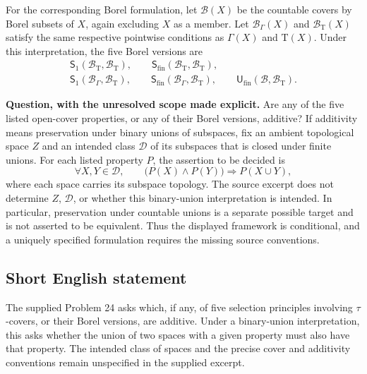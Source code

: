 \documentclass[11pt]{article}
\begin{document}
For the corresponding Borel formulation, let \(\mathcal B(X)\) be the countable covers by Borel subsets of \(X\), again excluding \(X\) as a member. Let \(\mathcal B_\Gamma(X)\) and \(\mathcal B_{\mathrm T}(X)\) satisfy the same respective pointwise conditions as \(\Gamma(X)\) and \(\mathrm T(X)\). Under this interpretation, the five Borel versions are
\[
\begin{gathered}
\mathsf S_1(\mathcal B_{\mathrm T},\mathcal B_{\mathrm T}),\qquad
\mathsf S_{\mathrm{fin}}(\mathcal B_{\mathrm T},\mathcal B_{\mathrm T}),\\
\mathsf S_1(\mathcal B_\Gamma,\mathcal B_{\mathrm T}),\qquad
\mathsf S_{\mathrm{fin}}(\mathcal B_\Gamma,\mathcal B_{\mathrm T}),\qquad
\mathsf U_{\mathrm{fin}}(\mathcal B,\mathcal B_{\mathrm T}).
\end{gathered}
\]

\textbf{Question, with the unresolved scope made explicit.} Are any of the five listed open-cover properties, or any of their Borel versions, additive? If additivity means preservation under binary unions of subspaces, fix an ambient topological space \(Z\) and an intended class \(\mathscr D\) of its subspaces that is closed under finite unions. For each listed property \(P\), the assertion to be decided is
\[
\forall X,Y\in\mathscr D,\qquad
\bigl(P(X)\land P(Y)\bigr)\Longrightarrow P(X\cup Y),
\]
where each space carries its subspace topology. The source excerpt does not determine \(Z\), \(\mathscr D\), or whether this binary-union interpretation is intended. In particular, preservation under countable unions is a separate possible target and is not asserted to be equivalent. Thus the displayed framework is conditional, and a uniquely specified formulation requires the missing source conventions.
\subsection{Short English statement}
The supplied Problem 24 asks which, if any, of five selection principles involving \(\tau\)-covers, or their Borel versions, are additive. Under a binary-union interpretation, this asks whether the union of two spaces with a given property must also have that property. The intended class of spaces and the precise cover and additivity conventions remain unspecified in the supplied excerpt.
\end{document}
